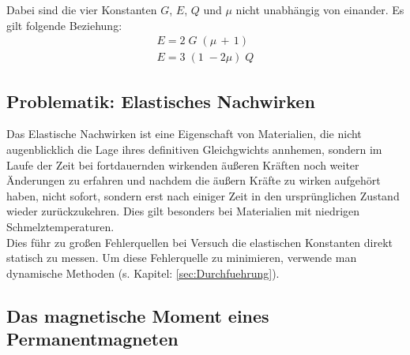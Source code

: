 Dabei sind die vier Konstanten $G$, $E$, $Q$ und $\mu$ nicht unabhängig von einander.
Es gilt folgende Beziehung:
\begin{gather}
    E = 2\;G\;(\mu\,+\,1) \\
    E = 3\;(1\;-2\mu)\;Q
\end{gather}


\subsection{Problematik: Elastisches Nachwirken}
Das Elastische Nachwirken ist eine Eigenschaft von Materialien, die nicht augenblicklich die Lage ihres definitiven 
Gleichgwichts annhemen, sondern im Laufe der Zeit bei fortdauernden wirkenden äußeren Kräften noch weiter Änderungen zu
erfahren und nachdem die äußern Kräfte zu wirken aufgehört haben, nicht sofort, sondern erst nach einiger Zeit in den 
ursprünglichen Zustand wieder zurückzukehren. %
Dies gilt besonders bei Materialien mit niedrigen Schmelztemperaturen.\\
Dies führ zu großen Fehlerquellen bei Versuch die elastischen Konstanten direkt statisch 
zu messen.\newline
Um diese Fehlerquelle zu minimieren, verwende man dynamische Methoden (s. Kapitel: \ref{sec:Durchfuehrung}). 


\subsection{Das magnetische Moment eines Permanentmagneten}
\label{sec:Theorie}
